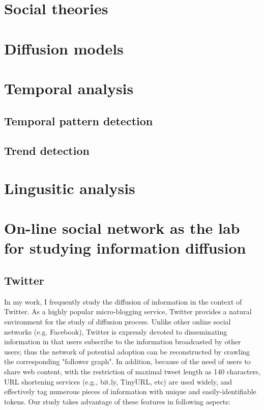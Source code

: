\documentclass[phd,tocprelim]{cornell}
\begin{document}
\section{Social theories}

\section{Diffusion models}


\section{Temporal analysis}
\subsection{Temporal pattern detection}
\subsection{Trend detection}

\section{Lingusitic analysis}

\section{On-line social network as the lab for studying information diffusion}
\subsection{Twitter}

In my work, I frequently study the diffusion of information in the context of Twitter. As a highly popular micro-blogging service, Twitter provides a natural environment for the study of diffusion process. Unlike other online social networks (e.g. Facebook), Twitter is expressly devoted to disseminating information in that users subscribe to the information broadcasted by other users; thus the network of potential adoption can be reconstructed by crawling the corresponding "follower graph". In addition, because of the need of users to share web content, with the restriction of maximal tweet length as 140 characters, URL shortening services (e.g., bit.ly, TinyURL, etc) are used widely, and effectively tag numerous pieces of information with unique and easily-identifiable tokens. Our study takes advantage of these features in following aspects:
\end{document}
